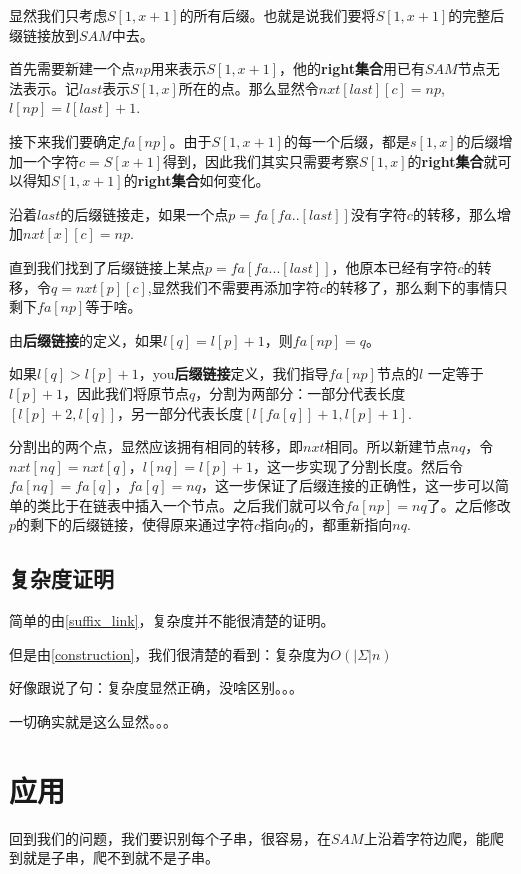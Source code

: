\documentclass[UTF8]{article}
\begin{document}
显然我们只考虑$S[1,x+1]$的所有后缀。也就是说我们要将$S[1,x+1]$的完整后缀链接放到$SAM$中去。

首先需要新建一个点$np$用来表示$S[1,x+1]$，他的\textbf{right集合}用已有$SAM$节点无法表示。记$last$表示$S[1,x]$所在的点。那么显然令$nxt[last][c] = np$,$l[np] = l[last] + 1$.

接下来我们要确定$fa[np]$。由于$S[1,x+1]$的每一个后缀，都是$s[1,x]$的后缀增加一个字符$c = S[x+1]$得到，因此我们其实只需要考察$S[1,x]$的\textbf{right集合}就可以得知$S[1,x+1]$的\textbf{right集合}如何变化。

沿着$last$的后缀链接走，如果一个点$p = fa[fa..[last]]$没有字符$c$的转移，那么增加$nxt[x][c] = np$.

直到我们找到了后缀链接上某点$p = fa[fa...[last]]$，他原本已经有字符$c$的转移，令$q = nxt[p][c]$,显然我们不需要再添加字符$c$的转移了，那么剩下的事情只剩下$fa[np]$等于啥。

由\textbf{后缀链接}的定义，如果$l[q] = l[p] + 1$，则$fa[np] = q$。

如果$l[q] > l[p] + 1$，you\textbf{后缀链接}定义，我们指导$fa[np]$节点的$l$ 一定等于$l[p] + 1$，因此我们将原节点$q$，分割为两部分：一部分代表长度$[l[p]+2,l[q]]$，另一部分代表长度$[l[fa[q]]+1,l[p]+ 1]$.

分割出的两个点，显然应该拥有相同的转移，即$nxt$相同。所以新建节点$nq$，令$nxt[nq] = nxt[q]$，$l[nq] = l[p] + 1$，这一步实现了分割长度。然后令$fa[nq] = fa[q]$，$fa[q] = nq$，这一步保证了后缀连接的正确性，这一步可以简单的类比于在链表中插入一个节点。之后我们就可以令$fa[np] = nq$了。之后修改$p$的剩下的后缀链接，使得原来通过字符$c$指向$q$的，都重新指向$nq$.
\subsection{复杂度证明}
简单的由\ref{suffix_link}，复杂度并不能很清楚的证明。

但是由\ref{construction}，我们很清楚的看到：复杂度为$O(|\Sigma|n)$

好像跟说了句：复杂度显然正确，没啥区别。。。

一切确实就是这么显然。。。

\vspace{\baselineskip}
\noindent\hrulefill

\section{应用}
回到我们的问题，我们要识别每个子串，很容易，在$SAM$上沿着字符边爬，能爬到就是子串，爬不到就不是子串。
\end{document}
